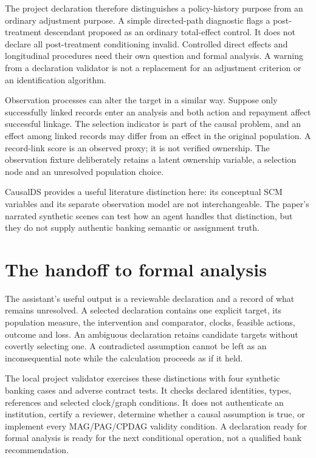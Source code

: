 The project declaration therefore distinguishes a policy-history purpose
from an ordinary adjustment purpose. A simple directed-path diagnostic flags
a post-treatment descendant proposed as an ordinary total-effect control.
It does not declare all post-treatment conditioning invalid. Controlled
direct effects and longitudinal procedures need their own question and
formal analysis. A warning from a declaration validator is not a replacement
for an adjustment criterion or an identification algorithm.

Observation processes can alter the target in a similar way. Suppose only
successfully linked records enter an analysis and both action and repayment
affect successful linkage. The selection indicator is part of the causal
problem, and an effect among linked records may differ from an effect in the
original population. A record-link score is an observed proxy; it is not
verified ownership. The observation fixture deliberately retains a latent
ownership variable, a selection node and an unresolved population choice.

CausalDS provides a useful literature distinction here: its conceptual SCM
variables and its separate observation model are not interchangeable. The
paper's narrated synthetic scenes can test how an agent handles that
distinction, but they do not supply authentic banking semantic or assignment
truth. \citep{v12_la_2607_08093}

\section{The handoff to formal analysis}

The assistant's useful output is a reviewable declaration and a record of
what remains unresolved. A selected declaration contains one explicit target,
its population measure, the intervention and comparator, clocks, feasible
actions, outcome and loss. An ambiguous declaration retains candidate targets
without covertly selecting one. A contradicted assumption cannot be left as
an inconsequential note while the calculation proceeds as if it held.

The local project validator exercises these distinctions with four synthetic
banking cases and adverse contract tests. It checks declared identities,
types, references and selected clock/graph conditions. It does not authenticate
an institution, certify a reviewer, determine whether a causal assumption is
true, or implement every MAG/PAG/CPDAG validity condition. A declaration ready
for formal analysis is ready for the next conditional operation, not a
qualified bank recommendation.

